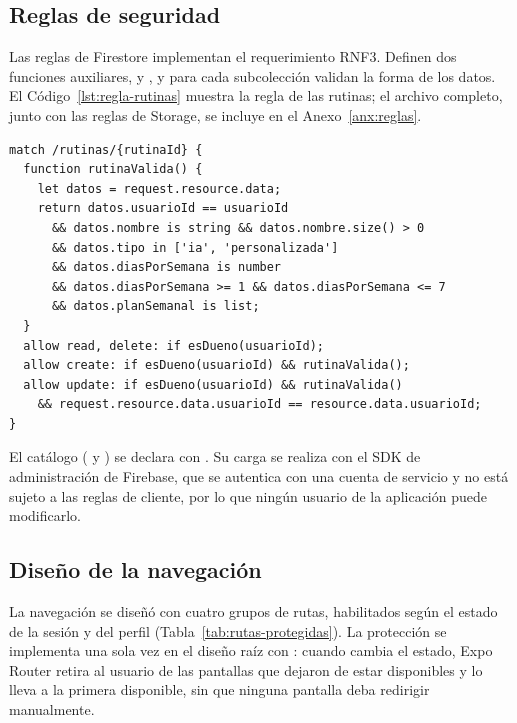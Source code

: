 \subsection{Reglas de seguridad}

Las reglas de Firestore implementan el requerimiento RNF3. Definen dos
funciones auxiliares,  y
, y para cada subcolección validan la forma de los
datos. El Código~\ref{lst:regla-rutinas} muestra la regla de las rutinas; el
archivo completo, junto con las reglas de Storage, se incluye en el
Anexo~\ref{anx:reglas}.

\begin{lstlisting}[language=FirestoreRules, caption={Regla de seguridad de la subcolección de rutinas}, label={lst:regla-rutinas}]
match /rutinas/{rutinaId} {
  function rutinaValida() {
    let datos = request.resource.data;
    return datos.usuarioId == usuarioId
      && datos.nombre is string && datos.nombre.size() > 0
      && datos.tipo in ['ia', 'personalizada']
      && datos.diasPorSemana is number
      && datos.diasPorSemana >= 1 && datos.diasPorSemana <= 7
      && datos.planSemanal is list;
  }
  allow read, delete: if esDueno(usuarioId);
  allow create: if esDueno(usuarioId) && rutinaValida();
  allow update: if esDueno(usuarioId) && rutinaValida()
    && request.resource.data.usuarioId == resource.data.usuarioId;
}
\end{lstlisting}

El catálogo ( y ) se declara con
. Su carga se realiza con el SDK de
administración de Firebase, que se autentica con una cuenta de servicio y no
está sujeto a las reglas de cliente, por lo que ningún usuario de la
aplicación puede modificarlo.

\subsection{Diseño de la navegación}

La navegación se diseñó con cuatro grupos de rutas, habilitados según el
estado de la sesión y del perfil (Tabla~\ref{tab:rutas-protegidas}). La
protección se implementa una sola vez en el diseño raíz con
: cuando cambia el estado, Expo Router retira al
usuario de las pantallas que dejaron de estar disponibles y lo lleva a la
primera disponible, sin que ninguna pantalla deba redirigir manualmente.

